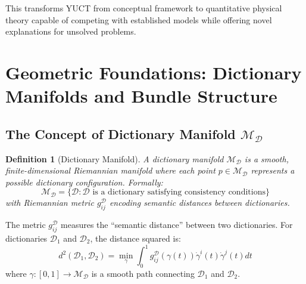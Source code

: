 \documentclass[11pt,a4paper]{article}
\newtheorem{definition}{Definition}
\begin{document}
This transforms YUCT from conceptual framework to quantitative physical theory capable of competing with established models while offering novel explanations for unsolved problems.


		\section{Geometric Foundations: Dictionary Manifolds and Bundle Structure}
	\subsection{The Concept of Dictionary Manifold $\mathcal{M}_{\mathcal{D}}$}
	
	\begin{definition}[Dictionary Manifold]
		A dictionary manifold $\mathcal{M}_{\mathcal{D}}$ is a smooth, finite-dimensional Riemannian manifold where each point $p \in \mathcal{M}_{\mathcal{D}}$ represents a possible dictionary configuration. Formally:
		\begin{equation}
			\mathcal{M}_{\mathcal{D}} = \{ \mathcal{D} : \mathcal{D} \text{ is a dictionary satisfying consistency conditions} \}
		\end{equation}
		with Riemannian metric $g_{ij}^{\mathcal{D}}$ encoding semantic distances between dictionaries.
	\end{definition}
	
	The metric $g_{ij}^{\mathcal{D}}$ measures the ``semantic distance'' between two dictionaries. For dictionaries $\mathcal{D}_1$ and $\mathcal{D}_2$, the distance squared is:
	\begin{equation}
		d^2(\mathcal{D}_1, \mathcal{D}_2) = \min_{\gamma} \int_0^1 g_{ij}^{\mathcal{D}}(\gamma(t)) \dot{\gamma}^i(t) \dot{\gamma}^j(t) dt
	\end{equation}
	where $\gamma: [0,1] \to \mathcal{M}_{\mathcal{D}}$ is a smooth path connecting $\mathcal{D}_1$ and $\mathcal{D}_2$.
	
\end{document}

